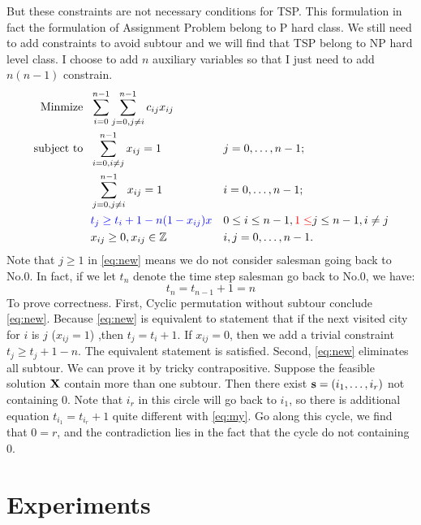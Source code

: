\documentclass{mcmthesis}
\begin{document}
But these constraints are not necessary conditions for TSP. This formulation in fact the formulation of Assignment Problem belong to P hard class. We still need to add constraints to avoid subtour and we will find that TSP belong to NP hard level class. I choose to add $n$ auxiliary variables so that I just need to add $n(n-1)$ constrain. 
\begin{align}
	\mathop{\mathrm{Minmize \ \  }}       & \sum _{i=0}^{n-1}\sum _{j=0,j\neq i}^{n-1}c_{ij}x_{ij} &  & \notag                     \\
	\mathop{\mathrm{subject \  to \ \  }} & \sum _{i=0,i\neq j}^{n-1}x_{ij}=1                    &  & j=0,\ldots ,n-1;  \notag     \\
	                                      & \sum _{j=0,j\neq i}^{n-1}x_{ij}=1                    &  & i=0,\ldots ,n-1;      \notag \\
	                                      & \color{Blue} t_{j} \ge t_{i}+1-n(1-x_{ij})x  &  & 0\leq i\leq n-1, {\color{Red}1 \le} j \le n-1, i \neq j   \label{eq:new}     \\
	                                      & x_{ij} \geq 0, x_{ij} \in \Zbb                     &  & i,j=0,\ldots ,n-1. \notag
\end{align}
Note that $j \ge 1 $ in \eqref{eq:new} means we do not consider salesman going back to No.0. In fact, if we let $t_{n}$ denote the time step salesman go back to No.0, we have:
\begin{equation}\label{eq:my}
t_{n}=t_{n-1}+1=n 
\end{equation}
 To prove correctness.  First, Cyclic permutation without subtour conclude \eqref{eq:new}. Because \eqref{eq:new} is equivalent to statement that   if the next visited city for $i$ is $j$ ($x_{ij}=1$) ,then $t_j=t_i+1$. If $x_{ij}=0$, then we add a trivial constraint $t_j \ge t_j +1-n$.  The equivalent statement is satisfied. Second, \eqref{eq:new} eliminates all subtour. We can prove it by tricky contrapositive. Suppose the feasible solution $\mathbf{X}$ contain more than one subtour. Then there exist $\mathbf{s}=(i_1,\dots,i_r)$ not containing 0. Note that $i_r$ in this circle will go back to $i_1$, so there is additional equation $t_{i_1}=t_{i_r}+1$  quite different with \eqref{eq:my}. Go along this cycle, we find that $0=r$, and the contradiction lies in the fact that the cycle do not containing 0.

\section{Experiments}
\end{document}
